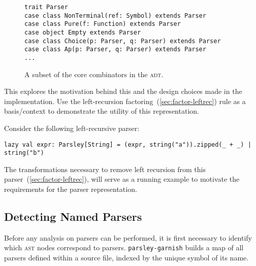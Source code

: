 \documentclass[../../main.tex]{subfiles}
\begin{document}
\begin{figure}[htbp]
\begin{verbatim}
trait Parser
case class NonTerminal(ref: Symbol) extends Parser
case class Pure(f: Function) extends Parser
case object Empty extends Parser
case class Choice(p: Parser, q: Parser) extends Parser
case class Ap(p: Parser, q: Parser) extends Parser
...
\end{verbatim}
\caption{A subset of the core combinators in the  \textsc{adt}.}
\label{fig:parser-adt}
\end{figure}


This  explores the motivation behind this and the design choices made in the implementation.
Use the left-recursion factoring~(\cref{sec:factor-leftrec}) rule as a basis/context to demonstrate the utility of this representation.


Consider the following left-recursive parser:
\begin{verbatim}
lazy val expr: Parsley[String] = (expr, string("a")).zipped(_ + _) | string("b")
\end{verbatim}
The transformations necessary to remove left recursion from this parser~(\cref{sec:factor-leftrec}), will serve as a running example to motivate the requirements for the parser representation.

\subsection{Detecting Named Parsers}
Before any analysis on parsers can be performed, it is first necessary to identify which \textsc{ast} nodes correspond to parsers.
\texttt{parsley-garnish} builds a map of all parsers defined within a source file, indexed by the unique symbol of its name.
\end{document}
